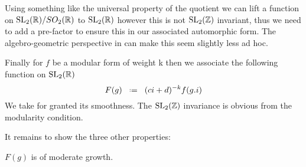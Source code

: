     Using something like the universal property of the quotient we can lift a function on \(\SL_2(\R) / SO_2(\R)\) to \(\SL_2(\R)\) however this is not \(\SL_2(\Z)\) invariant, thus we need to add a pre-factor to ensure this in our associated automorphic form. The algebro-geometric perspective in \cite{emertonCLASSICALMODULARFORMS} can make this seem slightly less ad hoc.


	Finally for \(f\) be a modular form of weight k then we associate the following function on \(\SL_2(\R)\)
	\[F(g) \defeq  (ci + d)^{-k}f(g.i)\]
	We take for granted its smoothness. The \(\SL_2(\Z)\) invariance is obvious from the modularity condition.

	It remains to show the three other properties:

	\begin{Lemma}
		\(F(g)\) is of moderate growth.
	\end{Lemma}

